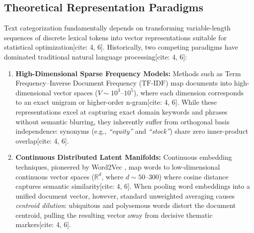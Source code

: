 \documentclass[11pt,a4paper]{article}
\begin{document}
	\subsection{Theoretical Representation Paradigms}
	Text categorization fundamentally depends on transforming variable-length sequences of discrete lexical tokens into vector representations suitable for statistical optimization[cite: 4, 6]. Historically, two competing paradigms have dominated traditional natural language processing[cite: 4, 6]:
	\begin{enumerate}[leftmargin=1.5em, itemsep=0.2em]
		\item \textbf{High-Dimensional Sparse Frequency Models:} Methods such as Term Frequency--Inverse Document Frequency ($\text{TF-IDF}$) map documents into high-dimensional vector spaces ($V \sim 10^3$--$10^5$), where each dimension corresponds to an exact unigram or higher-order n-gram[cite: 4, 6]. While these representations excel at capturing exact domain keywords and phrases without semantic blurring, they inherently suffer from orthogonal basis independence: synonyms (e.g., \textit{``equity''} and \textit{``stock''}) share zero inner-product overlap[cite: 4, 6].
		\item \textbf{Continuous Distributed Latent Manifolds:} Continuous embedding techniques, pioneered by Word2Vec \cite{mikolov2013distributed}, map words to low-dimensional continuous vector spaces ($\mathbb{R}^d$, where $d \sim 50$--$300$) where cosine distance captures semantic similarity[cite: 4, 6]. When pooling word embeddings into a unified document vector, however, standard unweighted averaging causes \textit{centroid dilution}: ubiquitous and polysemous words distort the document centroid, pulling the resulting vector away from decisive thematic markers[cite: 4, 6].
	\end{enumerate}
	
\end{document}
